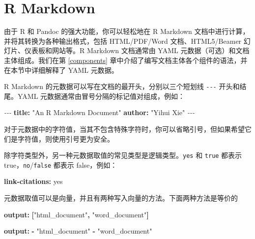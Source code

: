 \documentclass[
  12pt,
]{krantz}
\newenvironment{Shaded}{\begin{snugshade}}{\end{snugshade}}
\newcommand{\AttributeTok}[1]{\textcolor[rgb]{0.13,0.29,0.53}{#1}}
\newcommand{\CharTok}[1]{\textcolor[rgb]{0.31,0.60,0.02}{#1}}
\newcommand{\FunctionTok}[1]{\textcolor[rgb]{0.13,0.29,0.53}{\textbf{#1}}}
\newcommand{\KeywordTok}[1]{\textcolor[rgb]{0.13,0.29,0.53}{\textbf{#1}}}
\newcommand{\PreprocessorTok}[1]{\textcolor[rgb]{0.56,0.35,0.01}{\textit{#1}}}
\newcommand{\StringTok}[1]{\textcolor[rgb]{0.31,0.60,0.02}{#1}}
\theoremstyle{definition}
\theoremstyle{definition}
\theoremstyle{definition}
\theoremstyle{definition}
\theoremstyle{remark}
\begin{document}
\hypertarget{r-markdown}{%
\section{R Markdown}\label{r-markdown}}

由于 R 和 Pandoc 的强大功能，你可以轻松地在 R Markdown 文档中进行计算，并将其转换为各种输出格式，包括 HTML/PDF/Word 文档、HTML5/Beamer 幻灯片、仪表板和网站等。R Markdown 文档通常由 YAML 元数据（可选）和文档主体组成。我们在第 \ref{components} 章中介绍了编写文档主体各个组件的语法，并在本节中详细解释了 YAML 元数据。

R Markdown 的元数据可以写在文档的最开头，分别以三个短划线 \texttt{-\/-\/-} 开头和结尾。YAML 元数据通常由冒号分隔的标记值对组成，例如：

\begin{Shaded}
\begin{Highlighting}[]
\PreprocessorTok{{-}{-}{-}}
\FunctionTok{title}\KeywordTok{:}\AttributeTok{ }\StringTok{"An R Markdown Document"}
\FunctionTok{author}\KeywordTok{:}\AttributeTok{ }\StringTok{"Yihui Xie"}
\PreprocessorTok{{-}{-}{-}}
\end{Highlighting}
\end{Shaded}

对于元数据中的字符值，当其不包含特殊字符时，你可以省略引号，但如果希望它们是字符值，则使用引号更为安全。

除字符类型外，另一种元数据取值的常见类型是逻辑类型。\texttt{yes} 和 \texttt{true} 都表示 true，\texttt{no}/\texttt{false} 都表示 false，例如：

\begin{Shaded}
\begin{Highlighting}[]
\FunctionTok{link{-}citations}\KeywordTok{:}\AttributeTok{ }\CharTok{yes}
\end{Highlighting}
\end{Shaded}

元数据取值可以是向量，并且有两种写入向量的方法。下面两种方法是等价的

\begin{Shaded}
\begin{Highlighting}[]
\FunctionTok{output}\KeywordTok{:}\AttributeTok{ }\KeywordTok{[}\StringTok{"html\_document"}\KeywordTok{,}\AttributeTok{ }\StringTok{"word\_document"}\KeywordTok{]}
\end{Highlighting}
\end{Shaded}

\begin{Shaded}
\begin{Highlighting}[]
\FunctionTok{output}\KeywordTok{:}
\AttributeTok{  }\KeywordTok{{-}}\AttributeTok{ }\StringTok{"html\_document"}
\AttributeTok{  }\KeywordTok{{-}}\AttributeTok{ }\StringTok{"word\_document"}
\end{Highlighting}
\end{Shaded}
\end{document}

